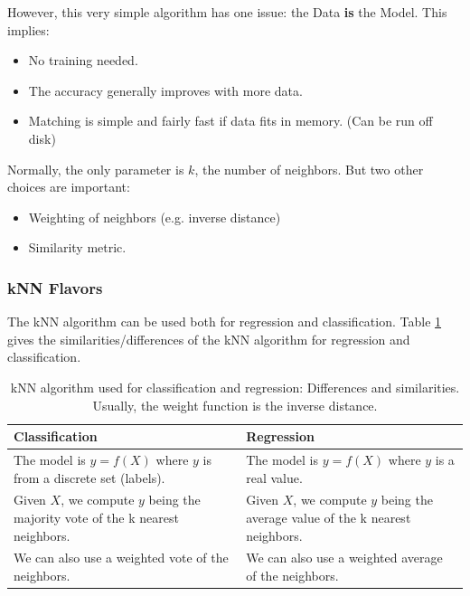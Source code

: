 However, this very simple algorithm has one issue: the Data {\bf is} the Model. This implies:
\begin{itemize}
 \item No training needed.
 \item The accuracy generally improves with more data.
 \item Matching is simple and fairly fast if data fits in memory. (Can be run off disk)
\end{itemize}
Normally, the only parameter is $k$, the number of neighbors. But two other choices are important:
\begin{itemize}
 \item Weighting of neighbors (e.g. inverse distance)
 \item Similarity metric.
\end{itemize}

\subsubsection{kNN Flavors}
The kNN algorithm can be used both for regression and classification. Table \ref{tab:knn} gives the similarities/differences of the kNN algorithm for regression and classification.
\begin{table}[h!]
 \centering
 \begin{tabular}{p{7cm}|p{7cm}}
  \textbf{Classification} & \textbf{Regression} \\ \hline \hline
  The model is $y=f(X)$ where $y$ is from a discrete set (labels). & The model is $y=f(X)$ where $y$ is a real value. \\ \hline
  Given $X$, we compute $y$ being the majority vote of the k nearest neighbors. & Given $X$, we compute $y$ being the average value of the k nearest neighbors. \\ \hline
  We can also use a weighted vote of the neighbors. & We can also use a weighted average of the neighbors.
 \end{tabular}
 \label{tab:knn}
 \caption{kNN algorithm used for classification and regression: Differences and similarities. Usually, the weight function is the inverse distance. 
}
\end{table}

